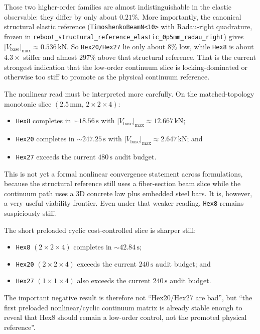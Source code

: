 Those two higher-order families are almost indistinguishable in the elastic
observable: they differ by only about \(0.21\%\). More importantly, the
canonical structural elastic reference
(\texttt{TimoshenkoBeamN<10>} with Radau-right quadrature, frozen in
\texttt{reboot\_structural\_reference\_elastic\_0p5mm\_radau\_right}) gives
\(|V_{\mathrm{base}}|_{\max} \approx 0.536\,\mathrm{kN}\). So
\texttt{Hex20/Hex27} lie only about \(8\%\) low, while \texttt{Hex8} is about
\(4.3\times\) stiffer and almost \(297\%\) above that structural reference.
That is the current strongest indication that the low-order continuum slice is
locking-dominated or otherwise too stiff to promote as the physical continuum
reference.

The nonlinear read must be interpreted more carefully. On the matched-topology
monotonic slice \((2.5\,\mathrm{mm},\,2\times2\times4)\):
\begin{itemize}
  \item \texttt{Hex8} completes in \(\sim 18.56\,\mathrm{s}\) with
    \(|V_{\mathrm{base}}|_{\max} \approx 12.667\,\mathrm{kN}\);
  \item \texttt{Hex20} completes in \(\sim 247.25\,\mathrm{s}\) with
    \(|V_{\mathrm{base}}|_{\max} \approx 2.647\,\mathrm{kN}\); and
  \item \texttt{Hex27} exceeds the current \(480\,\mathrm{s}\) audit budget.
\end{itemize}
This is not yet a formal nonlinear convergence statement across formulations,
because the structural reference still uses a fiber-section beam slice while
the continuum path uses a 3D concrete law plus embedded steel bars. It is,
however, a very useful viability frontier. Even under that weaker reading,
\texttt{Hex8} remains suspiciously stiff.

The short preloaded cyclic cost-controlled slice is sharper still:
\begin{itemize}
  \item \texttt{Hex8} \((2\times2\times4)\) completes in
    \(\sim 42.84\,\mathrm{s}\);
  \item \texttt{Hex20} \((2\times2\times4)\) exceeds the current
    \(240\,\mathrm{s}\) audit budget; and
  \item \texttt{Hex27} \((1\times1\times4)\) also exceeds the current
    \(240\,\mathrm{s}\) audit budget.
\end{itemize}
The important negative result is therefore not ``Hex20/Hex27 are bad'', but
``the first preloaded nonlinear/cyclic continuum matrix is already stable
enough to reveal that Hex8 should remain a low-order control, not the promoted
physical reference''.

